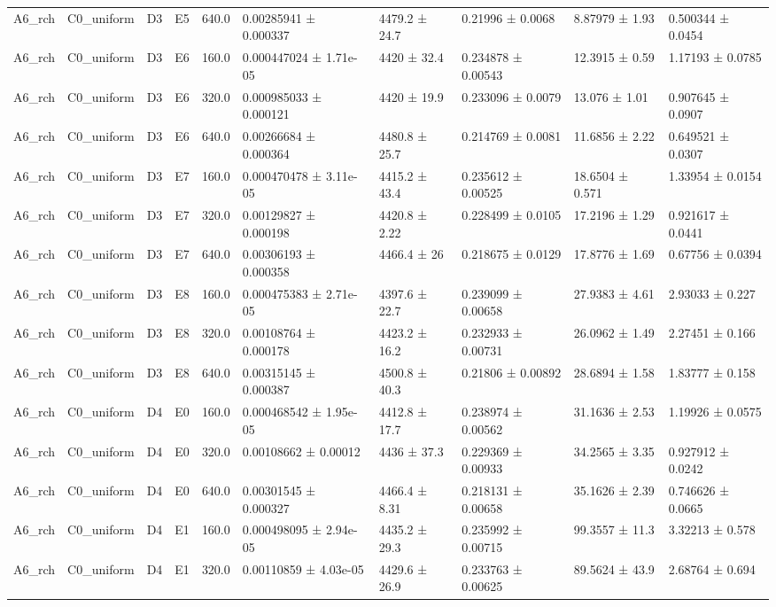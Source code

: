 \begin{table}
\begin{tabular}{llllllllll}
A6\_rch & C0\_uniform & D3 & E5 & 640.0 & 0.00285941 ± 0.000337 & 4479.2 ± 24.7 & 0.21996 ± 0.0068 & 8.87979 ± 1.93 & 0.500344 ± 0.0454 \\
A6\_rch & C0\_uniform & D3 & E6 & 160.0 & 0.000447024 ± 1.71e-05 & 4420 ± 32.4 & 0.234878 ± 0.00543 & 12.3915 ± 0.59 & 1.17193 ± 0.0785 \\
A6\_rch & C0\_uniform & D3 & E6 & 320.0 & 0.000985033 ± 0.000121 & 4420 ± 19.9 & 0.233096 ± 0.0079 & 13.076 ± 1.01 & 0.907645 ± 0.0907 \\
A6\_rch & C0\_uniform & D3 & E6 & 640.0 & 0.00266684 ± 0.000364 & 4480.8 ± 25.7 & 0.214769 ± 0.0081 & 11.6856 ± 2.22 & 0.649521 ± 0.0307 \\
A6\_rch & C0\_uniform & D3 & E7 & 160.0 & 0.000470478 ± 3.11e-05 & 4415.2 ± 43.4 & 0.235612 ± 0.00525 & 18.6504 ± 0.571 & 1.33954 ± 0.0154 \\
A6\_rch & C0\_uniform & D3 & E7 & 320.0 & 0.00129827 ± 0.000198 & 4420.8 ± 2.22 & 0.228499 ± 0.0105 & 17.2196 ± 1.29 & 0.921617 ± 0.0441 \\
A6\_rch & C0\_uniform & D3 & E7 & 640.0 & 0.00306193 ± 0.000358 & 4466.4 ± 26 & 0.218675 ± 0.0129 & 17.8776 ± 1.69 & 0.67756 ± 0.0394 \\
A6\_rch & C0\_uniform & D3 & E8 & 160.0 & 0.000475383 ± 2.71e-05 & 4397.6 ± 22.7 & 0.239099 ± 0.00658 & 27.9383 ± 4.61 & 2.93033 ± 0.227 \\
A6\_rch & C0\_uniform & D3 & E8 & 320.0 & 0.00108764 ± 0.000178 & 4423.2 ± 16.2 & 0.232933 ± 0.00731 & 26.0962 ± 1.49 & 2.27451 ± 0.166 \\
A6\_rch & C0\_uniform & D3 & E8 & 640.0 & 0.00315145 ± 0.000387 & 4500.8 ± 40.3 & 0.21806 ± 0.00892 & 28.6894 ± 1.58 & 1.83777 ± 0.158 \\
A6\_rch & C0\_uniform & D4 & E0 & 160.0 & 0.000468542 ± 1.95e-05 & 4412.8 ± 17.7 & 0.238974 ± 0.00562 & 31.1636 ± 2.53 & 1.19926 ± 0.0575 \\
A6\_rch & C0\_uniform & D4 & E0 & 320.0 & 0.00108662 ± 0.00012 & 4436 ± 37.3 & 0.229369 ± 0.00933 & 34.2565 ± 3.35 & 0.927912 ± 0.0242 \\
A6\_rch & C0\_uniform & D4 & E0 & 640.0 & 0.00301545 ± 0.000327 & 4466.4 ± 8.31 & 0.218131 ± 0.00658 & 35.1626 ± 2.39 & 0.746626 ± 0.0665 \\
A6\_rch & C0\_uniform & D4 & E1 & 160.0 & 0.000498095 ± 2.94e-05 & 4435.2 ± 29.3 & 0.235992 ± 0.00715 & 99.3557 ± 11.3 & 3.32213 ± 0.578 \\
A6\_rch & C0\_uniform & D4 & E1 & 320.0 & 0.00110859 ± 4.03e-05 & 4429.6 ± 26.9 & 0.233763 ± 0.00625 & 89.5624 ± 43.9 & 2.68764 ± 0.694 \\

\end{tabular}
\end{table}
